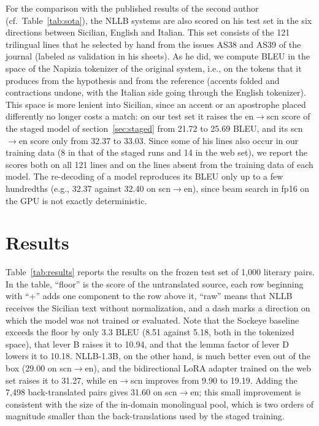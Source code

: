 \documentclass[11pt,a4paper]{article}
\begin{document}
For the comparison with the published results of the second author (cf.\
Table~\ref{tab:sota}), the NLLB systems are also scored on his test set in the six directions
between Sicilian, English and Italian. This set consists of the 121 trilingual lines that he
selected by hand from the issues AS38 and AS39 of the journal (labeled as validation in his
sheets). As he
did, we compute BLEU in the space of the Napizia tokenizer of the original system, i.e., on the
tokens that it produces from the hypothesis and from the reference (accents folded and
contractions undone, with the Italian side going through the English tokenizer). This space is
more lenient into Sicilian, since an accent or an apostrophe placed differently no longer costs a
match: on our test set it raises the en$\rightarrow$scn score of the staged model of
section~\ref{sec:staged} from 21.72 to 25.69 BLEU, and its scn$\rightarrow$en score only from
32.37 to 33.03. Since some of his lines also occur in our training data (8 in that of the staged
runs and 14 in the web set), we report the scores both on all 121 lines and on the lines absent
from the training data of each model. The re-decoding of a model reproduces its BLEU only up to a
few hundredths (e.g., 32.37 against 32.40 on scn$\rightarrow$en), since beam search in fp16 on
the GPU is not exactly deterministic.



\section{Results}
\label{sec:results}
Table~\ref{tab:results} reports the results on the frozen test set of 1{,}000 literary pairs. In
the table, ``floor'' is the score of the untranslated source, each row beginning with ``+'' adds
one component to the row above it, ``raw'' means that NLLB receives the Sicilian text without
normalization, and a dash marks a direction on which the model was not trained or evaluated. Note that the Sockeye baseline exceeds the floor by only 3.3 BLEU
(8.51 against 5.18, both in the tokenized space), that lever B raises it to 10.94, and that the lemma factor of lever D lowers it to 10.18. NLLB-1.3B, on the
other hand, is much better even out of the box (29.00 on scn$\to$en), and the bidirectional LoRA adapter trained on the web set raises it to 31.27, while en$\to$scn improves from 9.90 to 19.19. Adding the 7{,}498 back-translated
pairs gives 31.60 on scn$\to$en; this small improvement is consistent with the size of the
in-domain monolingual pool, which is two orders of magnitude smaller than the back-translations
used by the staged training.
\end{document}
